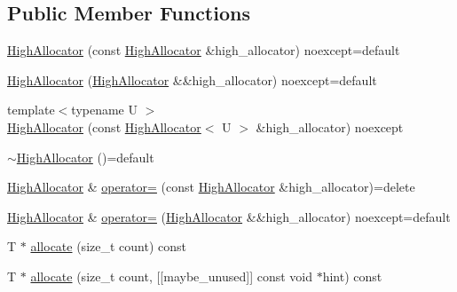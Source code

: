 \subsection*{Public Member Functions}
\begin{DoxyCompactItemize}
\item 
\mbox{\hyperlink{classmage_1_1_double_ended_memory_stack_1_1_high_allocator_ac1cb29fb8c7e53f90fd05d0c2feeb6a8}{High\+Allocator}} (const \mbox{\hyperlink{classmage_1_1_double_ended_memory_stack_1_1_high_allocator}{High\+Allocator}} \&high\+\_\+allocator) noexcept=default
\item 
\mbox{\hyperlink{classmage_1_1_double_ended_memory_stack_1_1_high_allocator_a4d7cf78e9d279f91bc2247a1dcbbccd6}{High\+Allocator}} (\mbox{\hyperlink{classmage_1_1_double_ended_memory_stack_1_1_high_allocator}{High\+Allocator}} \&\&high\+\_\+allocator) noexcept=default
\item 
{\footnotesize template$<$typename U $>$ }\\\mbox{\hyperlink{classmage_1_1_double_ended_memory_stack_1_1_high_allocator_a9283a193758a9a83adef3598c884af97}{High\+Allocator}} (const \mbox{\hyperlink{classmage_1_1_double_ended_memory_stack_1_1_high_allocator}{High\+Allocator}}$<$ U $>$ \&high\+\_\+allocator) noexcept
\item 
\mbox{\hyperlink{classmage_1_1_double_ended_memory_stack_1_1_high_allocator_a2a27e1ab0cad95cf83e63b8c7d2cb102}{$\sim$\+High\+Allocator}} ()=default
\item 
\mbox{\hyperlink{classmage_1_1_double_ended_memory_stack_1_1_high_allocator}{High\+Allocator}} \& \mbox{\hyperlink{classmage_1_1_double_ended_memory_stack_1_1_high_allocator_acf31dee2d290adef5221cc3b012ce902}{operator=}} (const \mbox{\hyperlink{classmage_1_1_double_ended_memory_stack_1_1_high_allocator}{High\+Allocator}} \&high\+\_\+allocator)=delete
\item 
\mbox{\hyperlink{classmage_1_1_double_ended_memory_stack_1_1_high_allocator}{High\+Allocator}} \& \mbox{\hyperlink{classmage_1_1_double_ended_memory_stack_1_1_high_allocator_af9a43783cbf9d7dbce2aa8ae73c7d87b}{operator=}} (\mbox{\hyperlink{classmage_1_1_double_ended_memory_stack_1_1_high_allocator}{High\+Allocator}} \&\&high\+\_\+allocator) noexcept=default
\item 
T $\ast$ \mbox{\hyperlink{classmage_1_1_double_ended_memory_stack_1_1_high_allocator_a5ff5e84cec1625e9c6f2bdff75ee54c7}{allocate}} (size\+\_\+t count) const
\item 
T $\ast$ \mbox{\hyperlink{classmage_1_1_double_ended_memory_stack_1_1_high_allocator_af3e6165e636944142ac49aa52db70115}{allocate}} (size\+\_\+t count, \mbox{[}\mbox{[}maybe\+\_\+unused\mbox{]}\mbox{]} const void $\ast$hint) const

\end{DoxyCompactItemize}
